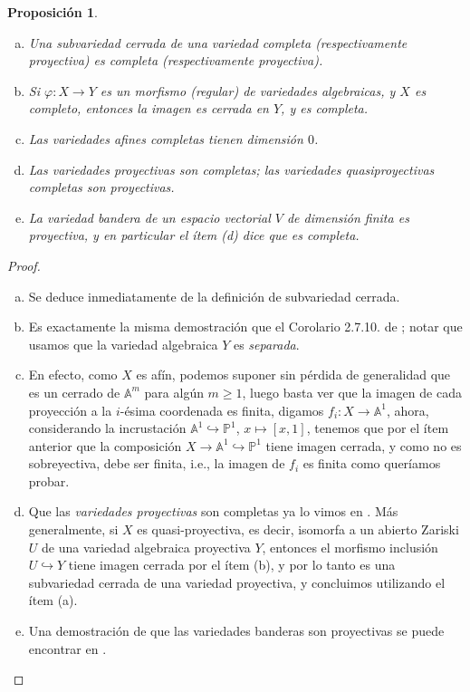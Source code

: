 \documentclass[spanish,10pt]{amsart}
\newtheorem{proposition}[theorem]{Proposición}
\theoremstyle{definition}
\theoremstyle{remark}
\numberwithin{equation}{section}
\newcommand{\afine}[1]{\mathbb{A}^{#1}}
\newcommand{\projective}[1]{\mathbb{P}^{#1}}
\begin{document}
\begin{proposition}\label{proposicion:varios hechos sobre variedades completas}
\begin{enumerate}[(a)]
\item Una subvariedad cerrada de una variedad completa (respectivamente proyectiva) es completa (respectivamente proyectiva).
\item Si $\varphi : X \to Y$ es un morfismo (regular) de variedades algebraicas, y $X$ es completo, entonces la imagen es cerrada en $Y$, y es completa.
\item Las variedades afines completas tienen dimensión $0$.
\item Las variedades proyectivas son completas; las variedades quasiproyectivas completas son proyectivas.
\item La \textit{variedad bandera} de un espacio vectorial $V$ de dimensión finita es proyectiva, y en particular el ítem (d) dice que es completa.
\end{enumerate}
\end{proposition}
\begin{proof}
\begin{enumerate}[(a)]
\item Se deduce inmediatamente de la definición de subvariedad cerrada.
\item Es exactamente la misma demostración que el Corolario 2.7.10. de \cite{notas_pedro}; notar que usamos que la variedad algebraica $Y$ es \textit{separada}.
\item En efecto, como $X$ es afín, podemos suponer sin pérdida de generalidad que es un cerrado de $\afine m$ para algún $m \geq 1$, luego basta ver que la imagen de cada proyección a la $i$-ésima coordenada es finita, digamos $f_i : X \to \afine 1$, ahora, considerando la incrustación $\afine 1 \hookrightarrow \projective 1$, $x \mapsto [x, 1]$, tenemos que por el ítem anterior que la composición $X \to \afine 1 \hookrightarrow \projective 1$ tiene imagen cerrada, y como no es sobreyectiva, debe ser finita, i.e., la imagen de $f_i$ es finita como queríamos probar.
\item Que las \textit{variedades proyectivas} son completas ya lo vimos en \cite[Teorema \emph{2.7.9}]{notas_pedro}. Más generalmente, si $X$ es quasi-proyectiva, es decir, isomorfa a un abierto Zariski $U$ de una variedad algebraica proyectiva $Y$, entonces el morfismo inclusión $U \hookrightarrow Y$ tiene imagen cerrada por el ítem (b), y por lo tanto es una subvariedad cerrada de una variedad proyectiva, y concluimos utilizando el ítem (a).
\item Una demostración de que las variedades banderas son proyectivas se puede encontrar en \cite[Teorema 3.3.11.]{geckMeinolf2013introductionToAlgebraicGeometryAndAlgebraicGroups}.
\end{enumerate}
\end{proof}
\end{document}

